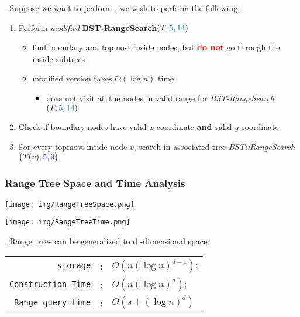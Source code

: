 \documentclass{article}
\begin{document}
\begin{algo}.
    Suppose we want to perform , we wish to perform the following: \begin{enumerate}
        \item Perform \textit{modified} \textbf{BST-RangeSearch}$(T, \textcolor{teal}{5}, \textcolor{teal}{14})$
        \begin{itemize}
            \item find boundary and topmost inside nodes, but \textbf{\textcolor{red}{do not}} go through the inside subtrees
            \item modified version takes $ O(\log n) $ time
            \begin{itemize}
                \item does not visit all the nodes in valid range for \textit{BST-RangeSearch}$(T, \textcolor{teal}{5}, \textcolor{teal}{14})$
            \end{itemize}
        \end{itemize}
        
        \item Check if boundary nodes have valid $ x $-coordinate \textbf{and} valid $ y $-coordinate
        
        \item For every topmost inside node $ v $, search in associated tree \textit{BST::RangeSearch}$\big( T(v), \textcolor{blue}{5}, \textcolor{blue}{9} \big)$
    
    \end{enumerate}
\end{algo}

\subsubsection{Range Tree Space and Time Analysis}

\begin{center}
    \texttt{[image: img/RangeTreeSpace.png]}
\end{center}
\begin{center}
    \texttt{[image: img/RangeTreeTime.png]}
\end{center}

\begin{result}[].
    Range trees can be generalized to d -dimensional space: \begin{center}
        \begin{tabular}{rcl}
            \texttt{storage} & : & $O(n ( \log n )^{d-1})$; \\ 
            \texttt{Construction Time} & : & $O(n ( \log n )^d)$; \\ 
            \texttt{Range query time} & : & $\displaystyle O \left( s + ( \log n )^d \right)$ 
        \end{tabular}    
    \end{center} 
\end{result}
\end{document}
